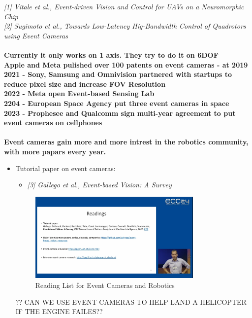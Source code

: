 \documentclass{article}
\begin{document}
\textit{[1] Vitale et al., Event-driven Vision and Control for UAVs on a Neuromorphic Chip}
\\
\textit{[2] Sugimoto et al., Towards Low-Latency Hig-Bandwidth Control of Quadrotors using Event Cameras}
\\
\\
\textbf{Currently it only works on 1 axis. They try to do it on 6DOF}
\\
\textbf{Apple and Meta pulished over 100 patents on event cameras - at 2019}
\\
\textbf{2021 - Sony, Samsung and Omnivision partnered with startups to reduce pixel size and increase FOV Resolution}
\\
\textbf{2022 - Meta open Event-based Sensing Lab}
\\
\textbf{2204 - European Space Agency put three event cameras in space}
\\
\textbf{2023 - Prophesee and Qualcomm sign multi-year agreement to put event cameras on cellphones}
\\
\\
\textbf{Event cameras gain more and more intrest in the robotics community, with more papars every year.}
\\
\begin{itemize}
    \item Tutorial paper on event cameras:
    \begin{itemize}
        \item \textit{[3] Gallego et al., Event-based Vision: A Survey}
    \end{itemize}

    \begin{figure}[h!]
        \centering
        \includegraphics[width=0.8\textwidth]{assets/reading-list.png}
        \caption{Reading List for Event Cameras and Robotics}
        \label{fig:reading_list}
    \end{figure}

    ?? CAN WE USE EVENT CAMERAS TO HELP LAND A HELICOPTER IF THE ENGINE FAILES??
    

\end{itemize}
\end{document}
